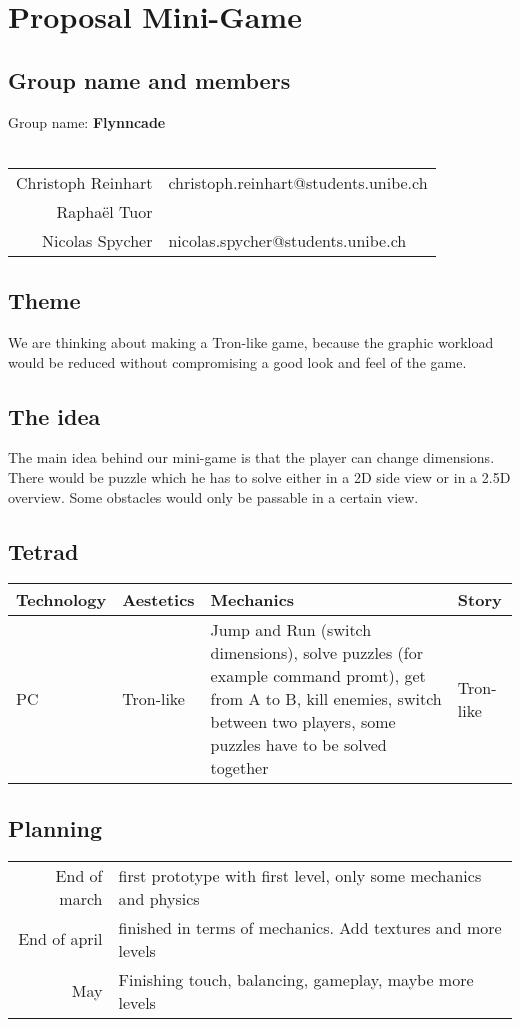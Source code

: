 \documentclass[a4paper, 10pt]{article}
\begin{document}
	\section{Proposal Mini-Game}
	
	\subsection{Group name and members}	
	
	Group name: \textbf{Flynncade}	
	\\
	\\
	\begin{tabular}{rl}
		Christoph Reinhart  & christoph.reinhart@students.unibe.ch\\
		Raphaël Tuor  &\\
		Nicolas Spycher & nicolas.spycher@students.unibe.ch
	\end{tabular}
	
	\subsection{Theme}
	\par{We are thinking about making a Tron-like game, because the graphic workload would be reduced without compromising a good look and feel of the game.}
	
	\subsection{The idea}
	\par{The main idea behind our mini-game is that the player can change dimensions. There would be puzzle which he has to solve either in a 2D side view or in a 2.5D overview. Some obstacles would only be passable in a certain view.}
	
	\subsection{Tetrad}
	\vspace{10pt}
	\begin{tabular}{ l | l | p{5cm} | p{2cm}}
		\textbf{Technology} & \textbf{Aestetics} & \textbf{Mechanics} & \textbf{Story} \\ \hline
		PC & Tron-like & Jump and Run (switch dimensions), solve puzzles (for example command promt), get from A to B, kill enemies, switch between two players, some puzzles have to be solved together & Tron-like \\
	\end{tabular}
	
	\subsection{Planning}
	\vspace{10pt}
	\begin{tabular}{rl}
		End of march & first prototype with first level, only some mechanics and physics \\
		End of april & finished in terms of mechanics. Add textures and more levels\\
		May & Finishing touch, balancing, gameplay, maybe more levels\\
	\end{tabular}
\end{document}
